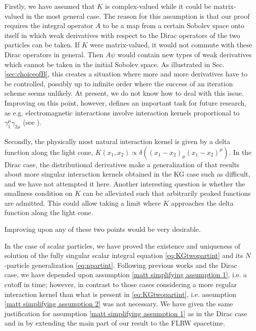 \documentclass[b5paper,draft,openbib,12pt]{memoir}
\begin{document}
Firstly, we have assumed that $K$ is complex-valued while it could 
be matrix-valued in the most general case. The reason for this 
assumption is that our proof requires the integral operator $A$ to 
be a map from a certain Sobolev space onto itself in which weak 
derivatives with respect to the Dirac operators of the two particles 
can be taken. If $K$ were matrix-valued, it would not commute with 
these Dirac operators in general. Then $A \psi$ would contain new 
types of weak derivatives which cannot be taken in the initial 
Sobolev space. As illustrated in Sec. \ref{sec:choiceofB}, this 
creates a situation where more and more derivatives have to be 
controlled, possibly up to infinite order where the success of an 
iteration scheme seems unlikely. At present, we do not know how to 
deal with this issue. 
Improving on this point, however, defines an important task for 
future research, as e.g. electromagnetic interactions involve 
interaction kernels proportional to $\gamma_1^\mu \gamma_{2\mu}$ 
(see \cite{direct_interaction_quantum}).

Secondly, the physically most 
natural interaction kernel is given by a delta function along the 
light cone, $K(x_1,x_2) \propto \delta((x_1-x_2)_\mu 
(x_1-x_2)^\mu)$. In the Dirac 
case, the distributional derivatives make a generalization of 
that results about more singular interaction kernels 
obtained in the KG case such as \cite{mtve,lienertcurved} difficult, 
and we have not attempted it here. 
Another interesting question is whether the smallness condition on 
$K$ can be alleviated such that arbitrarily peaked functions are 
admitted. This could allow taking a limit where $K$ approaches the 
delta function along the light cone.

Improving upon any of these two points would be very desirable.

In the case of scalar particles, we have proved the existence and 
uniqueness of solution of the fully singular  
scalar integral equation 
\eqref{eq:KGtwopartint} and its $N$-particle generalization 
\eqref{eq:npartint}. Following previous works and the 
Dirac case, we have depended upon assumption 
\ref{matt simplifying assumption 1}, i.e.
a cutoff in time; however, in contrast to 
those cases considering a more regular interaction 
kernel than what is present in \eqref{eq:KGtwopartint}, i.e. 
assumption \ref{matt simplifying assumption 2} was not necessary.
We have given the same justification for 
assumption \ref{matt simplifying assumption 1} as in the Dirac case and 
in \cite{lienertcurved}
by extending the main part of our result to the FLRW spacetime.
\end{document}
